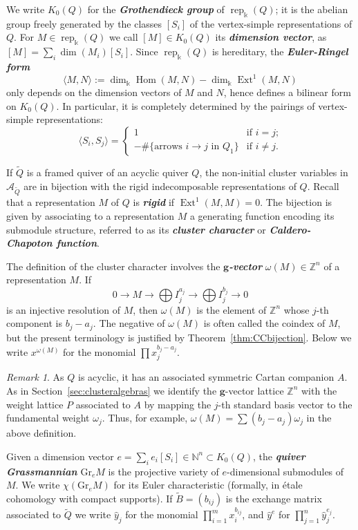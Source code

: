 \documentclass[12pt]{amsart}
\newcommand{\newword}[1]{\textbf{\emph{#1}}}
\newcommand{\cA}{\mathcal{A}}
\newcommand{\NN}{\mathbb{N}}
\newcommand{\ZZ}{\mathbb{Z}}
\newcommand{\kk}{\Bbbk}
\newcommand{\bfg}{\mathbf{g}}
\newcommand{\gv}{\omega}
\newcommand{\grep}{\gv}
\newcommand{\KQ}{K_0(Q)}
\newcommand{\Gr}{\mathrm{Gr}}
\newcommand{\rep}{\operatorname{rep}}
\DeclareMathOperator{\Ext}{Ext}
\DeclareMathOperator{\Hom}{Hom}
\newcommand{\Qrep}{M}
\theoremstyle{remark}
\newtheorem{remark}[theorem]{Remark}
\numberwithin{equation}{section}
\numberwithin{figure}{section}
\begin{document}
We write $\KQ$ for the \newword{Grothendieck group} of $\rep_\kk(Q)$; it is the abelian group freely generated by the classes $[S_i]$ of the vertex-simple representations of $Q$.
For $M\in\rep_\kk(Q)$ we call $[M]\in\KQ$ its \newword{dimension vector}, as $[\Qrep] = \sum_i \dim(M_i)[S_i]$.
Since $\rep_\kk(Q)$ is hereditary, the \newword{Euler-Ringel form} \[\langle M,N\rangle:=\dim_\kk\Hom(M,N)-\dim_\kk\Ext^1(M,N)\] only depends on the dimension vectors of $M$ and $N$, hence defines a bilinear form on $\KQ$.
In particular, it is completely determined by the pairings of vertex-simple representations:
\[
  \langle S_i,S_j\rangle=
  \begin{cases}
    1 & \text{if $i=j$;}\\
    -\#\{\text{arrows $i \to j$ in $Q_1$}\} & \text{if $i \neq j$.}
  \end{cases}
\]

If $\widetilde{Q}$ is a framed quiver of an acyclic quiver $Q$, the non-initial cluster variables in $\cA_{\widetilde{Q}}$ are in bijection with the rigid indecomposable representations of $Q$.
Recall that a representation $M$ of $Q$ is \newword{rigid} if $\Ext^1(M,M) = 0$.
The bijection is given by associating to a representation $M$ a generating function encoding its submodule structure, referred to as its \newword{cluster character} or \newword{Caldero-Chapoton function}.

The definition of the cluster character involves the \newword{$\bfg$-vector} $\grep(\Qrep)\in\ZZ^n$ of a representation $\Qrep$.
If
\[
  0 \to \Qrep \to \bigoplus I_j^{a_j} \to \bigoplus I_j^{b_j} \to 0
\]
is an injective resolution of $M$, then $\grep(\Qrep)$ is the element of $\ZZ^n$ whose $j$-th component is $b_j - a_j$.
The negative of $\grep(\Qrep)$ is often called the coindex of $M$, but the present terminology is justified by Theorem~\ref{thm:CCbijection}.
Below we write $x^{\grep(\Qrep)}$ for the monomial $\prod x_j^{b_j - a_j}$.

\begin{remark}
  As $Q$ is acyclic, it has an associated symmetric Cartan companion $A$.
  As in Section~\ref{sec:clusteralgebras} we identify the $\bfg$-vector lattice $\ZZ^n$ with the weight lattice $P$ associated to $A$ by mapping the $j$-th standard basis vector to the fundamental weight $\omega_j$.
Thus, for example, $\grep(\Qrep) = \sum (b_j - a_j)\omega_j$ in the above definition.
\end{remark}

Given a dimension vector $e = \sum_i e_i[S_i] \in \NN^n \subset \KQ$, the \newword{quiver Grassmannian} $\Gr_eM$ is the projective variety of $e$-dimensional submodules of $M$.
We write $\chi(\Gr_eM)$ for its Euler characteristic (formally, in \'etale cohomology with compact supports).
If $\widetilde{B}=(b_{ij})$ is the exchange matrix associated to $\widetilde{Q}$ we write $\hat{y}_j$ for the monomial $\prod\limits_{i=1}^m x_i^{b_{ij}}$, and $\hat{y}^e$ for $\prod\limits_{j=1}^n \hat{y}_j^{e_j}$.
\end{document}
